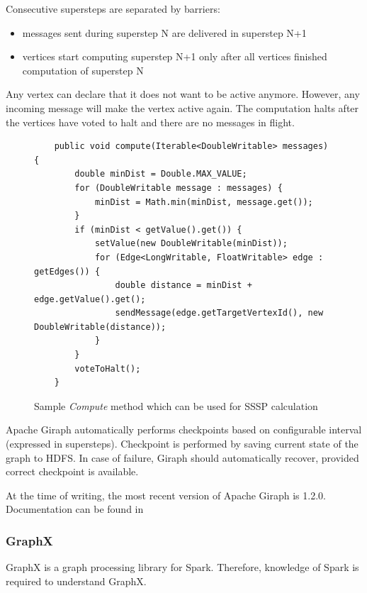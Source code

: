 \noindent
Consecutive supersteps are separated by barriers:
\begin{itemize}
    \item messages sent during superstep N are delivered in superstep N+1
    \item vertices start computing superstep N+1 only after all vertices finished computation of superstep N
\end{itemize}

Any vertex can declare that it does not want to be active anymore. However, any incoming message will make the vertex active again. The computation halts after the vertices have voted to halt and there are no messages in flight.

\begin{figure}
    \centering
    \begin{verbatim}
    public void compute(Iterable<DoubleWritable> messages) {
        double minDist = Double.MAX_VALUE;
        for (DoubleWritable message : messages) {
            minDist = Math.min(minDist, message.get());
        }
        if (minDist < getValue().get()) {
            setValue(new DoubleWritable(minDist));
            for (Edge<LongWritable, FloatWritable> edge : getEdges()) {
                double distance = minDist + edge.getValue().get();
                sendMessage(edge.getTargetVertexId(), new DoubleWritable(distance));
            }
        }
        voteToHalt();
    }
    \end{verbatim}
    \caption{Sample \textit{Compute} method which can be used for SSSP calculation}
    \label{fig:giraph-code-sample}
\end{figure}

Apache Giraph automatically performs checkpoints based on configurable interval (expressed in supersteps). Checkpoint is performed by saving current state of the graph to HDFS. In case of failure, Giraph should automatically recover, provided correct checkpoint is available. \cite{giraph-book}


\noindent
At the time of writing, the most recent version of Apache Giraph is 1.2.0. Documentation can be found in \cite{giraph-intro}

\subsubsection{GraphX}
GraphX is a graph processing library for Spark. Therefore, knowledge of Spark is required to understand GraphX.

